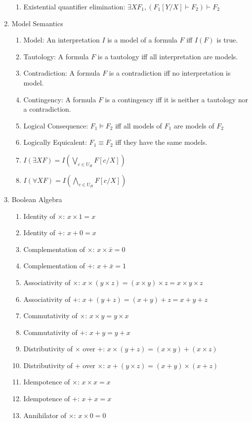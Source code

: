 \documentclass[11pt, twocolumn]{article}
\theoremstyle{definition} \newtheorem*{solution}{Solution}
\begin{document}
\begin{enumerate}
\begin{enumerate}
\item Existential quantifier elimination: $\exists X F_1, (F_1[Y/X] \vdash F_2) \vdash F_2$
\end{enumerate}
\item Model Semantics
\begin{enumerate}
\item Model: An interpretation $I$ is a model of a formula $F$ iff $I(F)$ is true.
\item Tautology: A formula $F$ is a tautology iff all interpretation are models.
\item Contradiction: A formula $F$ is a contradiction iff no interpretation is model.
\item Contingency: A formula $F$ is a contingency iff it is neither a tautology nor a contradiction.
\item Logical Consequence: $F_1 \models F_2$ iff all models of $F_1$ are models of $F_2$
\item Logically Equicalent: $F_1 \equiv F_2$ iff they have the same models.
\item $I(\exists X F) = I(\bigvee_{c\in U_H} F[c/X])$
\item $I(\forall X F) = I(\bigwedge_{c\in U_H} F[c/X])$
\end{enumerate}
\item Boolean Algebra
\begin{enumerate}
\item Identity of $\times$: $x \times 1 = x$
\item Identity of $+$: $x +0 = x$
\item Complementation of $\times$: $x \times \bar{x} =0$
\item Complementation of $+$: $x+ \bar{x} = 1$
\item Associativity of $\times$: $x\times(y\times z) = (x \times y)\times z=x\times y \times z$
\item Associativity of $+$: $x+(y+z)=(x+y)+z=x+y+z$
\item Commutativity of $\times$: $x\times y = y\times x$
\item Commutativity of $+$: $x+y=y+x$
\item Distributivity of $\times$ over $+$: $x\times(y+z)= (x\times y) +(x\times z)$
\item Distributivity of $+$ over $\times$: $x+(y\times z)= (x+y) \times (x+z)$
\item Idempotence of $\times$: $x\times x = x$
\item Idempotence of $+$: $x+x=x$
\item Annihilator of $\times $: $x\times 0=0$

\end{enumerate}
\end{enumerate}
\end{document}
